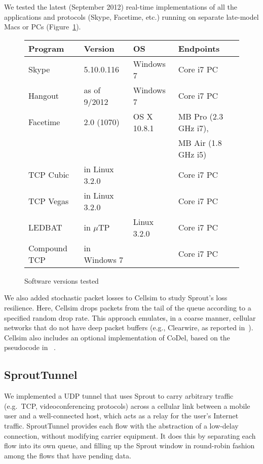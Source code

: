 We tested the latest (September 2012) real-time implementations of all
the applications and protocols (Skype, Facetime, etc.) running on
separate late-model Macs or PCs (Figure~\ref{f:software}).

\begin{figure}
  \caption{Software versions tested}
\hspace{\baselineskip}

\begin{centering}

\label{f:software}

\noindent \begin{tabular}{|l|l|l|l|}
\hline
Program & Version & OS & Endpoints \\
\hline
\hline
Skype & 5.10.0.116 & Windows 7 & Core i7 PC \\
Hangout & as of 9/2012 & Windows 7 & Core i7 PC \\
Facetime & 2.0 (1070) & OS X 10.8.1 & MB Pro (2.3 GHz i7),\\
& & & MB Air (1.8 GHz i5) \\
TCP Cubic & in Linux 3.2.0 & & Core i7 PC \\
TCP Vegas & in Linux 3.2.0 & & Core i7 PC \\
LEDBAT & in $\mu$TP & Linux 3.2.0 & Core i7 PC \\
Compound TCP & in Windows 7 & & Core i7 PC \\
\hline
\end{tabular}

\end{centering}
\end{figure}

We also added stochastic packet losses to Cellsim to study Sprout's
loss resilience. Here, Cellsim drops packets from the tail of the
queue according to a specified random drop rate.  This approach
emulates, in a coarse manner, cellular networks that do not have deep
packet buffers (e.g., Clearwire, as reported
in~\cite{Mahajan12}). Cellsim also includes an optional implementation
of CoDel, based on the pseudocode in ~\cite{CoDel}.

\subsection{SproutTunnel}

We implemented a UDP tunnel that uses Sprout to carry arbitrary
traffic (e.g.~TCP, videoconferencing protocols) across a cellular link
between a mobile user and a well-connected host, which acts as a relay
for the user's Internet traffic. SproutTunnel provides each flow with
the abstraction of a low-delay connection, without modifying carrier
equipment. It does this by separating each flow into its own queue,
and filling up the Sprout window in round-robin fashion among the
flows that have pending data.

